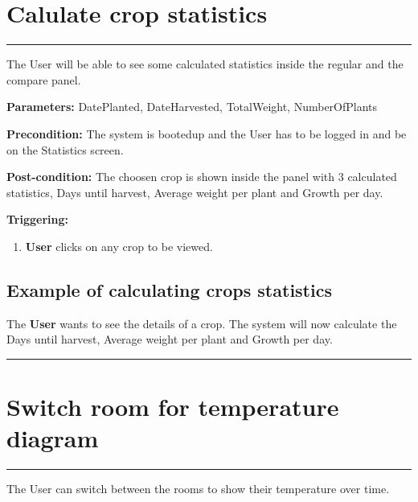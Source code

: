 \section{Calulate crop statistics}
\hrule
\hfill
\vspace{0.5cm}
\label{operation:Calculate crop statistics}

The User will be able to see some calculated statistics inside the regular and the compare panel.

\begin{description}

\item \textbf{Parameters:} DatePlanted, DateHarvested, TotalWeight, NumberOfPlants
\item \textbf{Precondition:} The system is bootedup and the User has to be
logged in and be on the Statistics screen.
\item \textbf{Post-condition:} The choosen crop is shown inside the panel with 3 calculated statistics, Days until harvest, Average weight per plant and Growth per day.
\item \textbf{Triggering:}
\begin{enumerate}

\item \textbf{User} clicks on any crop to be viewed.

\end{enumerate}
\end{description}

\subsection{Example of calculating crops statistics}
The \textbf{User} wants to see the details of a crop. The system will now calculate the Days until harvest, Average weight per plant and Growth per day.
\hfill
\vspace{0.5cm}
\hrule




\section{Switch room for temperature diagram}
\hrule
\hfill
\vspace{0.5cm}
\label{operation:Switch room for temperature diagram}

The User can switch between the rooms to show their temperature over time.

